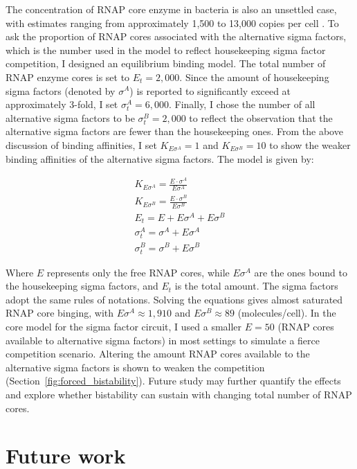 The concentration of RNAP core enzyme in bacteria is also
an unsettled case, with estimates ranging from
approximately 1,500 to 13,000 copies per cell \cite{jishage95,grigorova06}.
To ask the proportion of RNAP cores associated with
the alternative sigma factors, which is the number used in the model
to reflect housekeeping sigma factor competition,
I designed an equilibrium binding model.
The total number of RNAP enzyme cores is set to $E_t = 2,000$.
Since the amount of housekeeping sigma factors (denoted by $\sigma^A$)
is reported to significantly exceed at approximately 3-fold,
I set $\sigma^A_t = 6,000$.
Finally, I chose the number of all alternative sigma factors to be
$\sigma^B_t = 2,000$ to reflect the observation that the alternative
sigma factors are fewer than the housekeeping ones.
From the above discussion of binding affinities, I set
$K_{E\sigma^A} = 1$ and $K_{E\sigma^B} = 10$ to show the weaker 
binding affinities of the alternative sigma factors.
The model is given by:

\begin{gather}
    K_{E\sigma^A} = \frac{E \cdot \sigma^A}{E\sigma^A}\\
    K_{E\sigma^B} = \frac{E \cdot \sigma^B}{E\sigma^B}\\
    E_t = E + E\sigma^A + E\sigma^B\\
    \sigma^A_t = \sigma^A + E\sigma^A\\
    \sigma^B_t = \sigma^B + E\sigma^B
\end{gather}

Where $E$ represents only the free RNAP cores, while $E\sigma^A$
are the ones bound to the housekeeping sigma factors,
and $E_t$ is the total amount.
The sigma factors adopt the same rules of notations.
Solving the equations gives almost saturated RNAP core binging,
with $E\sigma^A \approx 1,910$ and $E\sigma^B \approx 89$
(molecules/cell).
In the core model for the sigma factor circuit,
I used a smaller $E = 50$ (RNAP cores available to alternative 
sigma factors) in most settings
to simulate a fierce competition scenario.
Altering the amount RNAP cores available to the alternative sigma
factors is shown to weaken the competition 
(Section~\ref{fig:forced_bistability}).
Future study may further quantify the effects and explore
whether bistability can sustain with changing total number of RNAP cores.

\section{Future work}

